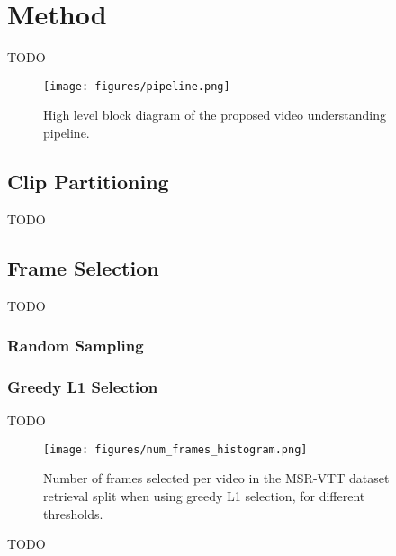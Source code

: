 \section{Method}

TODO

\begin{figure}[h]
      \centering
      \texttt{[image: figures/pipeline.png]}
      \caption{High level block diagram of the proposed video understanding pipeline.}
      \label{fig:pipeline}
\end{figure}



\subsection{Clip Partitioning}

TODO

\subsection{Frame Selection}

TODO

\subsubsection{Random Sampling}

\subsubsection{Greedy L1 Selection}

TODO

\begin{figure}
      \centering
      \texttt{[image: figures/num\_frames\_histogram.png]}
      \caption{Number of frames selected per video in the MSR-VTT dataset retrieval split when using greedy L1 selection, for different thresholds.}
      \label{fig:optical_flow}
\end{figure}

TODO
